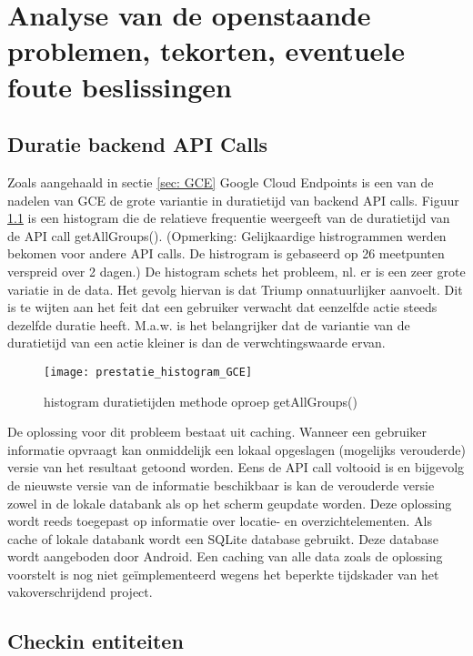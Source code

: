 
\chapter{Analyse van de openstaande problemen, tekorten, eventuele foute beslissingen}

\section{Duratie backend API Calls}

Zoals aangehaald in sectie \ref{sec: GCE} Google Cloud Endpoints is een van de nadelen van GCE de grote variantie in duratietijd van backend API calls. Figuur \ref{fig:hist_getAllGroups} is een histogram die de relatieve frequentie weergeeft van de duratietijd van de API call getAllGroups(). (Opmerking: Gelijkaardige histrogrammen werden bekomen voor andere API calls. De histrogram is gebaseerd op 26 meetpunten verspreid over 2 dagen.) De histogram schets het probleem, nl. er is een zeer grote variatie in de data. Het gevolg hiervan is dat Triump onnatuurlijker aanvoelt. Dit is te wijten aan het feit dat een gebruiker verwacht dat eenzelfde actie steeds dezelfde duratie heeft. M.a.w. is het belangrijker dat de variantie van de duratietijd van een actie kleiner is dan de verwchtingswaarde ervan.

\begin{figure}[H]
	\centering
	\texttt{[image: prestatie\_histogram\_GCE]}
	\caption{histogram duratietijden methode oproep getAllGroups()}
	\label{fig:hist_getAllGroups}
\end{figure}

De oplossing voor dit probleem bestaat uit caching. Wanneer een gebruiker informatie opvraagt kan onmiddelijk een lokaal opgeslagen (mogelijks verouderde) versie van het resultaat getoond worden. Eens de API call voltooid is en bijgevolg de nieuwste versie van de informatie beschikbaar is kan de verouderde versie zowel in de lokale databank als op het scherm geupdate worden. Deze oplossing wordt reeds toegepast op informatie over locatie- en overzichtelementen. Als cache of lokale databank wordt een SQLite database gebruikt. Deze database wordt aangeboden door Android. Een caching van alle data zoals de oplossing voorstelt is nog niet geïmplementeerd wegens het beperkte tijdskader van het vakoverschrijdend project.

\section{Checkin entiteiten}

